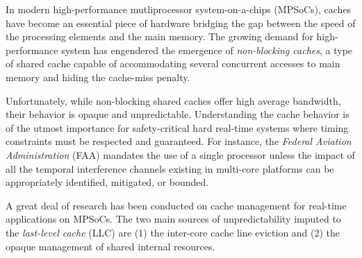 
    In modern high-performance mutliprocessor system-on-a-chips (MPSoCs), caches have become an essential piece of hardware bridging the gap between the speed of the processing elements and the main memory.
    The growing demand for high-performance system has engendered the emergence of \emph{non-blocking caches}, a type of shared cache capable of accommodating several concurrent accesses to main memory and hiding the cache-miss penalty.

    Unfortunately, while non-blocking shared caches offer high average bandwidth, their behavior is opaque and unpredictable.
    Understanding the cache behavior is of the utmost importance for safety-critical hard real-time systems where timing constraints must be respected and guaranteed.
    For instance, the \emph{Federal Aviation Administration} (FAA) mandates the use of a single processor unless the impact of all the temporal interference channels existing in multi-core platforms can be appropriately identified, mitigated, or bounded.

    A great deal of research has been conducted on cache management for real-time applications on MPSoCs.
    The two main sources of unpredictability imputed to the \emph{last-level cache} (LLC) are (1) the inter-core cache line eviction and (2) the opaque management of shared internal resources.

